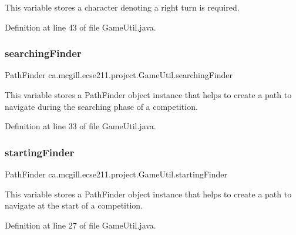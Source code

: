 This variable stores a character denoting a right turn is required. 

Definition at line 43 of file Game\+Util.\+java.

\mbox{\label{classca_1_1mcgill_1_1ecse211_1_1project_1_1_game_util_acedc99ad369450d6b2d7711c2d63027a}} 
\subsubsection{\texorpdfstring{searching\+Finder}{searchingFinder}}
{\footnotesize\ttfamily Path\+Finder ca.\+mcgill.\+ecse211.\+project.\+Game\+Util.\+searching\+Finder\hspace{0.3cm}{\ttfamily [static]}}

This variable stores a Path\+Finder object instance that helps to create a path to navigate during the searching phase of a competition. 

Definition at line 33 of file Game\+Util.\+java.

\mbox{\label{classca_1_1mcgill_1_1ecse211_1_1project_1_1_game_util_a84ec23eabf60cb20895815e7b390e3f2}} 
\subsubsection{\texorpdfstring{starting\+Finder}{startingFinder}}
{\footnotesize\ttfamily Path\+Finder ca.\+mcgill.\+ecse211.\+project.\+Game\+Util.\+starting\+Finder\hspace{0.3cm}{\ttfamily [static]}}

This variable stores a Path\+Finder object instance that helps to create a path to navigate at the start of a competition. 

Definition at line 27 of file Game\+Util.\+java.

